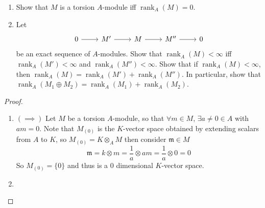 \documentclass[hidelinks,12pt]{article}
\newcommand{\rk}{\operatorname{rank}}
\begin{document}
\begin{enumerate}
        \begin{enumerate}[label=(\alph*).]
            \item Show that \(M\) is a torsion \(A\)-module iff \(\rk_{A}(M)=0\).
            \item Let \[
                    \begin{tikzcd}
                        0\arrow[r] & M' \arrow[r] & M\arrow[r] & M''\arrow[r] & 0
                    \end{tikzcd}
                \] be an exact sequence of \(A\)-modules. Show that \(\rk_{A}(M)<\infty\) iff \(\rk_{A}(M')<\infty\) and \(\rk_{A}(M'')<\infty\). Show that if \(\rk_{A}(M)<\infty\), then \(\rk_{A}(M)=\rk_{A}(M')+\rk_{A}(M'')\). In particular, show that \(\rk_{A}(M_{1}\oplus M_{2})=\rk_{A}(M_{1})+\rk_{A}(M_{2})\).
        \end{enumerate}
        \begin{proof}
        \begin{enumerate}[label=(\alph*).]
            \item \((\implies)\) Let \(M\) be a torsion \(A\)-module, so that \(\forall m\in M\), \(\exists a\neq0\in A\) with \(am=0\). Note that \(M_{(0)}\) is the \(K\)-vector space obtained by extending scalars from \(A\) to \(K\), so \(M_{(0)}=K\otimes_{A} M\) then consider \(\mathfrak{m}\in M\)
                \[
                    \mathfrak{m}=k\otimes m=\frac{1}{a}\otimes am=\frac{1}{a}\otimes 0=0
                \]
                So \(M_{(0)}=\{0\}\) and thus is a 0 dimensional \(K\)-vector space.
            \item 
        \end{enumerate}
        \end{proof}
\end{enumerate}
\end{document}
